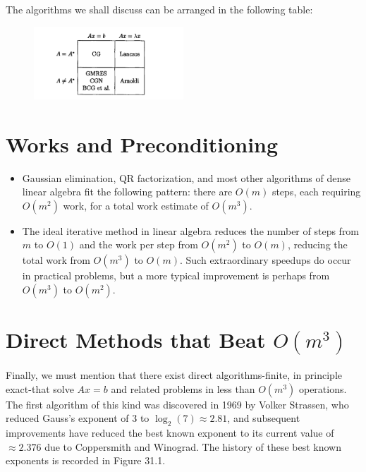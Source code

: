  The algorithms we shall discuss can be arranged in the following table: 

\begin{figure}[H]
    \centering
    \includegraphics[width=0.5\textwidth]{figures/32-1.png}
\end{figure}
 
 \section{Works and Preconditioning}
 \begin{itemize}
    \item Gaussian elimination, QR factorization, and most other algorithms of dense linear algebra fit the following pattern: there are $O(m)$ steps, each requiring $O\left(m^2\right)$ work, for a total work estimate of $O\left(m^3\right)$. 
    \item The ideal iterative method in linear algebra reduces the number of steps from $m$ to $O(1)$ and the work per step from $O\left(m^2\right)$ to $O(m)$, reducing the total work from $O\left(m^3\right)$ to $O(m)$. Such extraordinary speedups do occur in practical problems, but a more typical improvement is perhaps from $O\left(m^3\right)$ to $O\left(m^2\right)$.
 \end{itemize} 
  
 \section{Direct Methods that Beat $ O(m^{3}) $}

  Finally, we must mention that there exist direct algorithms-finite, in principle exact-that solve $A x=b$ and related problems in less than $O\left(m^3\right)$ operations. The first algorithm of this kind was discovered in 1969 by Volker Strassen, who reduced Gauss's exponent of 3 to $\log _2(7) \approx 2.81$, and subsequent improvements have reduced the best known exponent to its current value of $\approx 2.376$ due to Coppersmith and Winograd. The history of these best known exponents is recorded in Figure 31.1.

